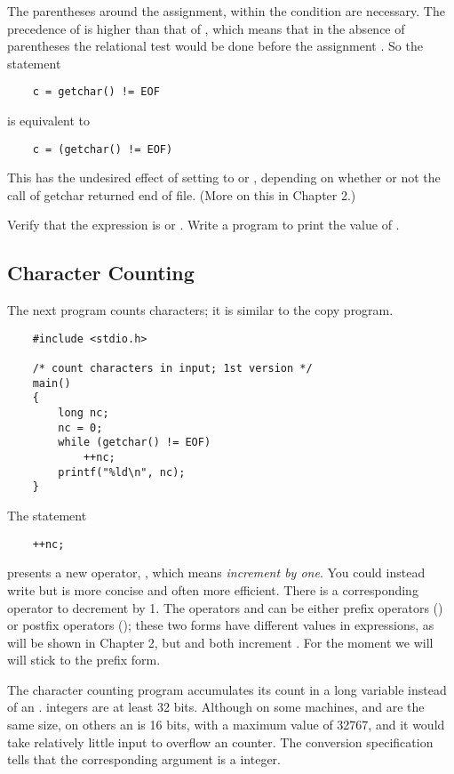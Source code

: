 The parentheses around the assignment, within the condition are necessary.
The precedence of \code{!=} is higher than that of \code{=}, which means that in the absence of parentheses the relational test \code{!=} would be done before the assignment \code{=}.
So the statement
\begin{lstlisting}
	c = getchar() != EOF
\end{lstlisting}
is equivalent to
\begin{lstlisting}
	c = (getchar() != EOF)
\end{lstlisting}
This has the undesired effect of setting  to  or , depending on whether or not the call of getchar returned end of file. (More on this in Chapter 2.)
\newline

\begin{ExerciseList}
\Exercise Verify that the expression  is  or .
\Exercise Write a program to print the value of .
\end{ExerciseList}



\subsection{Character Counting}


The next program counts characters; it is similar to the copy program.
\begin{lstlisting}
	#include <stdio.h>

	/* count characters in input; 1st version */
	main()
	{
		long nc;
		nc = 0;
		while (getchar() != EOF)
			++nc;
		printf("%ld\n", nc);
	}
\end{lstlisting}
The statement
\begin{lstlisting}
	++nc;
\end{lstlisting}
presents a new operator, \code{++}, which means \emph{increment by one}.
You could instead write  but  is more concise and often more efficient.
There is a corresponding operator \code{--} to decrement by 1.
The operators \code{++} and \code{--} can be either prefix operators () or postfix operators ();
these two forms have different values in expressions, as will be shown in Chapter 2, but  and  both increment .
For the moment we will will stick to the prefix form.

The character counting program accumulates its count in a long variable instead of an .
 integers are at least 32 bits.
Although on some machines,  and  are the same size, on others an  is 16 bits, with a maximum value of 32767, and it would take relatively little input to overflow an  counter.
The conversion specification  tells  that the corresponding argument is a  integer.


